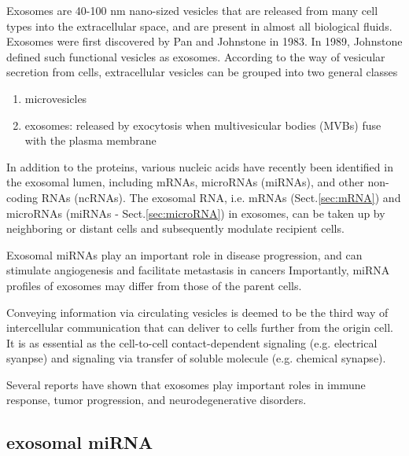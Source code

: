 Exosomes are 40-100 nm nano-sized vesicles that are released from many cell
types into the extracellular space, and are present in almost all biological
fluids. Exosomes were first discovered by Pan and Johnstone in 1983.
In 1989, Johnstone defined such functional vesicles as exosomes.
According to the way of vesicular secretion from cells, extracellular vesicles
can be grouped into two general classes
\begin{enumerate}
  \item microvesicles
  
  \item exosomes: released by exocytosis when multivesicular bodies (MVBs)
  fuse with the plasma membrane
\end{enumerate}

 In addition to the proteins, various nucleic acids have recently been
identified in the exosomal lumen, including mRNAs, microRNAs (miRNAs), and other
non-coding RNAs (ncRNAs). The exosomal RNA, i.e. mRNAs (Sect.\ref{sec:mRNA}) and
microRNAs (miRNAs - Sect.\ref{sec:microRNA}) in exosomes, can be taken up by
neighboring or distant cells and subsequently modulate recipient cells.

Exosomal miRNAs play an important role in disease progression, and can stimulate
angiogenesis and facilitate metastasis in cancers
Importantly, miRNA profiles of exosomes may differ from those of the parent cells.


Conveying information via circulating vesicles is deemed to be the third way of
intercellular communication that can deliver to cells further from the origin
cell. It is as essential as the cell-to-cell contact-dependent signaling
(e.g. electrical syanpse) and signaling via transfer of soluble molecule (e.g.
chemical synapse).


Several reports have shown that exosomes play important roles in immune
response, tumor progression, and neurodegenerative disorders. 

\subsection{exosomal miRNA}
\label{sec:miRNA-in-exosome}

